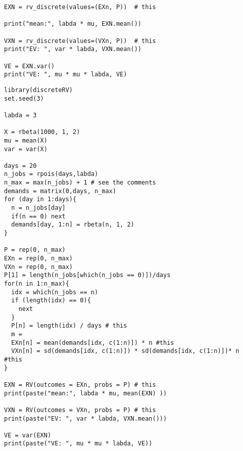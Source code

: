 \begin{exercise}
\begin{verbatim}
EXN = rv_discrete(values=(EXn, P))  # this

print("mean:", labda * mu, EXN.mean())

VXN = rv_discrete(values=(VXn, P))  # this
print("EV: ", var * labda, VXN.mean())

VE = EXN.var()
print("VE: ", mu * mu * labda, VE)
\end{verbatim}


\begin{verbatim}
library(discreteRV)
set.seed(3)

labda = 3

X = rbeta(1000, 1, 2)
mu = mean(X)
var = var(X)

days = 20
n_jobs = rpois(days,labda)
n_max = max(n_jobs) + 1 # see the comments
demands = matrix(0,days, n_max)
for (day in 1:days){
  n = n_jobs[day]
  if(n == 0) next
  demands[day, 1:n] = rbeta(n, 1, 2) 
}

P = rep(0, n_max)
EXn = rep(0, n_max)
VXn = rep(0, n_max)
P[1] = length(n_jobs[which(n_jobs == 0)])/days
for(n in 1:n_max){
  idx = which(n_jobs == n)
  if (length(idx) == 0){
    next
  }
  P[n] = length(idx) / days # this
  m = 
  EXn[n] = mean(demands[idx, c(1:n)]) * n #this
  VXn[n] = sd(demands[idx, c(1:n)]) * sd(demands[idx, c(1:n)])* n #this
}

EXN = RV(outcomes = EXn, probs = P) # this
print(paste("mean:", labda * mu, mean(EXN) ))

VXN = RV(outcomes = VXn, probs = P) # this
print(paste("EV: ", var * labda, VXN.mean()))

VE = var(EXN)
print(paste("VE: ", mu * mu * labda, VE))
\end{verbatim}

\end{exercise}


